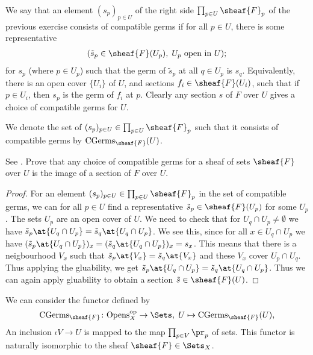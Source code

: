 \begin{definition}
  We say that an element $(s_p)_{p\in U}$ of the right side
  $\prod_{p\in U} \sheaf{F}_p$ of the previous exercise consists of
  compatible germs if for all $p\in U$, there is some representative
  \begin{align*}
    (\tilde{s}_p \in \sheaf{F}(U_p), \; U_p \text{ open in }U);
  \end{align*}
  for $s_p$ (where $p\in U_p$) such that the germ of $\tilde{s}_p$ at
  all $q \in U_p$ is $s_q$. Equivalently, there is an open cover
  $\{U_i\}$ of $U$, and sections $f_i \in \sheaf{F} (U_i)$, such that
  if $p \in U_i$, then $s_p$ is the germ of $f_i$ at $p$. Clearly any
  section $s$ of $F$ over $U$ gives a choice of compatible germs for
  $U$.

  We denote the set of $(s_p)_{p\in U}\in \prod_{p\in U} \sheaf{F}_p$
  such that it consists of compatible germs by $\CGerms_{\sheaf{F}}(U)$.
\end{definition}

\begin{exercise}[2.4.B]
  See \cite[2.4.B]{vakil2024the-rising-sea}.
  Prove that any choice of compatible germs for a sheaf of sets
  $\sheaf{F}$ over $U$ is the image of a section of $F$ over $U$.
\end{exercise}

\begin{proof}
  For an element $(s_p)_{p\in U}\in
  \prod_{p\in U}\sheaf{F}_p$ in the set of compatible germs, we can
  for all $p\in U$ 
  find a representative  $\tilde{s}_p\in \sheaf{F}(U_p)$ for some
  $U_p$.
  The sets $U_p$ are an open cover of $U$.
  We need to check that for $U_q \cap U_p\neq \emptyset$ we have
  $\tilde{s}_p\at{U_q \cap U_p} = \tilde{s}_q\at{U_q \cap U_p}$. We
  see this, since for all $x \in U_q\cap U_p$ we have
  $(\tilde{s}_p\at{U_q \cap U_p})_x = (\tilde{s}_q\at{U_q \cap U_p})_x
  = s_x$. This means that there is a neigbourhood $V_x$ such that
  $\tilde{s}_p\at{V_x} = \tilde{s}_q\at{V_x}$ and these $V_x$ cover
  $U_p \cap U_q$. Thus applying the gluability, we get
  $\tilde{s}_p\at{U_q \cap U_p} = \tilde{s}_q\at{U_q \cap U_p}$. Thus
  we can again apply gluability to obtain a section
  $\tilde{s}\in \sheaf{F}(U)$.
\end{proof}

\begin{proposition}
  We can consider the functor defined by
  \begin{align*}
    \CGerms_\sheaf{F}\colon \Opens_X^\op \rightarrow \Sets, \;
    U\mapsto \CGerms_{\sheaf{F}}(U),
  \end{align*}
  An inclusion $\iota V\rightarrow U$ is mapped to the map
  $\prod_{p\in V}\pr_{p} $ of sets. This functor is
  naturally isomorphic to the sheaf $\sheaf{F}\in \Sets_X$.
\end{proposition}

